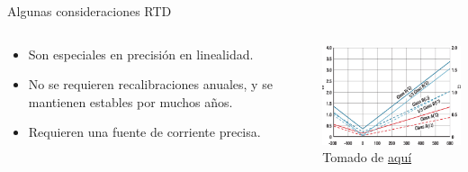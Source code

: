 \documentclass[aspectratio=169]{beamer}
\begin{document}
\begin{frame}{Algunas consideraciones RTD}
    \begin{columns}[c, onlytextwidth]
    \begin{column}{0.55\textwidth}
            \begin{itemize}
                \item Son especiales en precisión en linealidad.      
                \item No se requieren recalibraciones anuales, y se mantienen estables por muchos años. 
                \item Requieren una fuente de corriente precisa. 
            \end{itemize}
        \end{column}
        \begin{column}{0.45\textwidth}
        \includegraphics[width=6.5cm]{fig/RTD Curve.jpg}
            \\ \tiny{Tomado de \href{http://www.bearingsensor.com/bearing-rtd.html}{aquí}}
            
        \end{column}
        
    \end{columns}
\end{frame}
\end{document}
